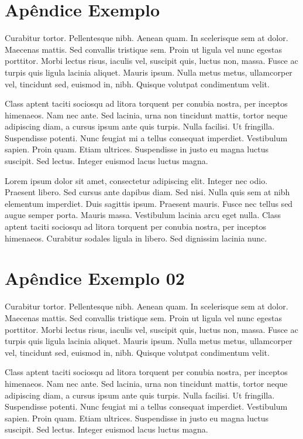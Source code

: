 \chapter{Apêndice Exemplo}

Curabitur tortor. Pellentesque nibh. Aenean quam. In scelerisque sem at dolor. Maecenas mattis. Sed convallis tristique sem. Proin ut ligula vel nunc egestas porttitor. Morbi lectus risus, iaculis vel, suscipit quis, luctus non, massa. Fusce ac turpis quis ligula lacinia aliquet. Mauris ipsum. Nulla metus metus, ullamcorper vel, tincidunt sed, euismod in, nibh. Quisque volutpat condimentum velit.

Class aptent taciti sociosqu ad litora torquent per conubia nostra, per inceptos himenaeos. Nam nec ante. Sed lacinia, urna non tincidunt mattis, tortor neque adipiscing diam, a cursus ipsum ante quis turpis. Nulla facilisi. Ut fringilla. Suspendisse potenti. Nunc feugiat mi a tellus consequat imperdiet. Vestibulum sapien. Proin quam. Etiam ultrices. Suspendisse in justo eu magna luctus suscipit. Sed lectus. Integer euismod lacus luctus magna.

Lorem ipsum dolor sit amet, consectetur adipiscing elit. Integer nec odio. Praesent libero. Sed cursus ante dapibus diam. Sed nisi. Nulla quis sem at nibh elementum imperdiet. Duis sagittis ipsum. Praesent mauris. Fusce nec tellus sed augue semper porta. Mauris massa. Vestibulum lacinia arcu eget nulla. Class aptent taciti sociosqu ad litora torquent per conubia nostra, per inceptos himenaeos. Curabitur sodales ligula in libero. Sed dignissim lacinia nunc.

\chapter{Apêndice Exemplo 02}

Curabitur tortor. Pellentesque nibh. Aenean quam. In scelerisque sem at dolor. Maecenas mattis. Sed convallis tristique sem. Proin ut ligula vel nunc egestas porttitor. Morbi lectus risus, iaculis vel, suscipit quis, luctus non, massa. Fusce ac turpis quis ligula lacinia aliquet. Mauris ipsum. Nulla metus metus, ullamcorper vel, tincidunt sed, euismod in, nibh. Quisque volutpat condimentum velit.

Class aptent taciti sociosqu ad litora torquent per conubia nostra, per inceptos himenaeos. Nam nec ante. Sed lacinia, urna non tincidunt mattis, tortor neque adipiscing diam, a cursus ipsum ante quis turpis. Nulla facilisi. Ut fringilla. Suspendisse potenti. Nunc feugiat mi a tellus consequat imperdiet. Vestibulum sapien. Proin quam. Etiam ultrices. Suspendisse in justo eu magna luctus suscipit. Sed lectus. Integer euismod lacus luctus magna.

